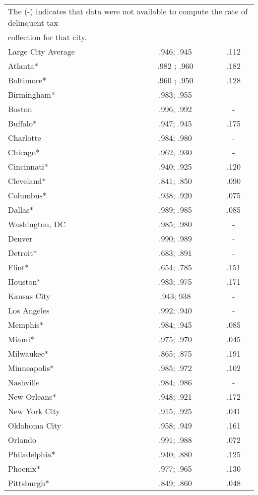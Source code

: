 \documentclass[12pt,titlepage]{article}
\begin{document}
\begin{center}
\begin{longtable}{| l | c |  c|}
\multicolumn{3}{l}{The (-) indicates that data were not available to compute the rate of delinquent tax} \\
\multicolumn{3}{l}{collection for that city.}  \\
\endlastfoot
Large City Average & .946; .945	& .112 \\
Atlanta*	  & .982 ;  .960 & .182 \\
Baltimore*	 & .960 ;  .950	 & .128 \\
Birmingham*	 & .983;  .955	& - \\
Boston	         & .996;  .992	 & - \\
Buffalo*	 & .947;  .945	 & .175 \\
Charlotte	 & .984;  .980	 & - \\
Chicago*	 & .962;  .930	 & - \\
Cincinnati*	 & .940;  .925	 & .120 \\
Cleveland*	 & .841;  .850	 & .090 \\
Columbus*	 & .938;  .920	 & .075 \\
Dallas*	         & .989;  .985	 & .085 \\
Washington, DC	 & .985;  .980	 & - \\
Denver	         & .990;  .989	 & - \\
Detroit*	 & .683;  .891	 & - \\
Flint*	         & .654;  .785	 & .151 \\
Houston*	 & .983;  .975	 & .171 \\
Kansas City	 & .943; 938	 & - \\
Los Angeles	 & .992;  .940	 & - \\
Memphis*	 & .984;  .945	 & .085 \\
Miami*	         & .975;  .970	 & .045 \\
Milwaukee*	 & .865;  .875	 & .191 \\
Minneapolis*	 & .985;  .972	 & .102 \\
Nashville	 & .984;  .986	 & - \\
New Orleans*	 & .948;  .921	 & .172 \\
New York City	 & .915;  .925	 & .041 \\
Oklahoma City	 & .958;  .949	 & .161 \\
Orlando	         & .991;  .988	 & .072 \\
Philadelphia*	 & .940;  .880	 & .125 \\
Phoenix*	 & .977;  .965	 & .130 \\
Pittsburgh*	 & .849;  .860	 & .048 \\

\end{longtable}
\end{center}
\end{document}
